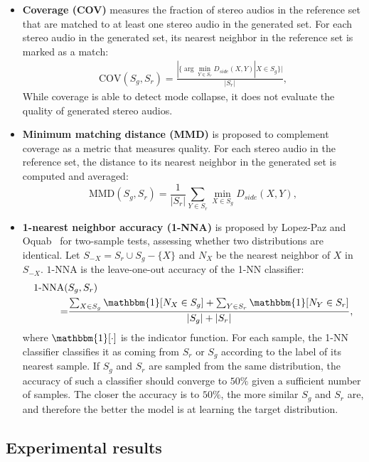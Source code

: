\begin{itemize}
	\item\textbf{Coverage (COV)} measures the fraction of stereo audios in the reference set that are matched to at least one stereo audio in the generated set. For each stereo audio in the generated set, its nearest neighbor in the reference set is marked as a match:
	\begin{align*}
	\text{COV}(S_g, S_r) = \frac{|\{\arg\min_{Y \in S_r} D_{side}(X,Y) | X \in S_g \}|}{|S_r|},
	\end{align*}
	While coverage is able to detect mode collapse, it does not evaluate the quality of generated stereo audios. 
	\item\textbf{Minimum matching distance (MMD)} is proposed to complement coverage as a metric that measures quality. For each stereo audio in the reference set, the distance to its nearest neighbor in the generated set is computed and averaged:
	\begin{equation}
	\text{MMD}(S_g, S_r) = \frac{1}{|S_r|}\sum_{Y\in S_r} \min_{X\in S_g} D_{side}(X,Y),\nonumber
	\end{equation}
	
	\item \textbf{1-nearest neighbor accuracy (1-NNA)} is proposed by Lopez-Paz and Oquab~\cite{1-nna} for two-sample tests, assessing whether two distributions are identical.
	Let $S_{-X} = S_r \cup S_g - \{X\}$ and $N_X$ be the nearest neighbor of $X$ in $S_{-X}$. $1$-NNA is the leave-one-out accuracy of the 1-NN classifier:
	\begin{align*}
	\text{1-NNA}(&S_g, S_r) \\
	=&\frac{\sum_{X\in S_g} \mathbbm{1}[N_X \in S_g] +  \sum_{Y\in S_r} \mathbbm{1}[N_Y \in S_r]}{|S_g|+|S_r|} ,
	\end{align*}
	where $\mathbbm{1}[\cdot]$ is the indicator function.
	For each sample, the 1-NN classifier classifies it as coming from $S_r$ or $S_g$ according to the label of its nearest sample.
	If $S_g$ and $S_r$ are sampled from the same distribution, the accuracy of such a classifier should converge to $50\%$ given a sufficient number of samples. The closer the accuracy is to $50\%$, the more similar $S_g$ and $S_r$ are, and therefore the better the model is at learning the target distribution.
\end{itemize}

\subsection{Experimental results}
\label{subsec:result}
